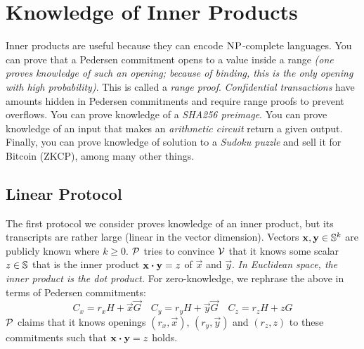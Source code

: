 \section{Knowledge of Inner Products}

Inner products are useful because they can encode $\operatorname{\textsc{NP}}$-complete languages.
%
You can prove that a Pedersen commitment opens to a value inside a range
\emph{(one proves knowledge of such an opening; because of binding, this is the only opening with high probability)}.
This is called a \emph{range proof}.
\emph{Confidential transactions} have amounts hidden in Pedersen commitments and require range proofs to prevent overflows.
%
You can prove knowledge of a \emph{SHA256 preimage}.
%
You can prove knowledge of an input that makes an \emph{arithmetic circuit} return a given output.
%
Finally,
you can prove knowledge of solution to a \emph{Sudoku puzzle} and sell it for Bitcoin (ZKCP),
among many other things.

\subsection{Linear Protocol}

The first protocol we consider proves knowledge of an inner product,
but its transcripts are rather large (linear in the vector dimension).
%
Vectors $\mathbf{x}, \mathbf{y} \in \mathbb{S}^k$ are publicly known where $k \geq 0$.
$\mathcal{P}$ tries to convince $\mathcal{V}$ that it knows some scalar $z \in \mathbb{S}$ that is the inner product $\mathbf{x} \boldsymbol{\cdot} \mathbf{y} = z$ of $\vec{x}$ and $\vec{y}$.
\emph{In Euclidean space, the inner product is the dot product.}
%
For zero-knowledge,
we rephrase the above in terms of Pedersen commitments:
\[
    C_x = r_xH + \vec{x}\vec{G} \quad C_y = r_yH + \vec{y}\vec{G} \quad C_z = r_zH + zG
\]
%
$\mathcal{P}$ claims that it knows openings $(r_x, \vec{x})$, $(r_y, \vec{y})$ and $(r_z, z)$ to these commitments such that $\mathbf{x} \boldsymbol{\cdot} \mathbf{y} = z$ holds.

